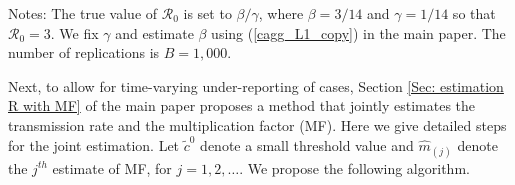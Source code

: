 \documentclass[12pt]{article}
\begin{document}
\begin{table}[tbh]
\begin{center}
\end{center}

%

\footnotesize\flushleft
{}Notes: The true value of $\mathcal{R}_{0}$ is set to $\beta/\gamma$, where
$\beta=3/14$ and $\gamma=1/14$ so that $\mathcal{R}_{0}=3$. We fix $\gamma$
and estimate $\beta$ using (\ref{cagg_L1_copy}) in the main paper. The number
of replications is $B=1,000$.%

\end{table}%


Next, to allow for time-varying under-reporting of cases, Section
\ref{Sec: estimation R with MF} of the main paper proposes a method that
jointly estimates the transmission rate and the multiplication factor (MF).
Here we give detailed steps for the joint estimation. Let $\tilde{c}^{0}$
denote a small threshold value and $\hat{m}_{\left(  j\right)  }$ denote the
$j^{th}$ estimate of MF, for $j=1,2,\ldots$. We propose the following algorithm.
\end{document}
